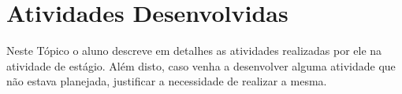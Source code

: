 
\section{Atividades Desenvolvidas}
    \label{sec:atividades-desenvolvidas}
    
    Neste Tópico o aluno descreve em detalhes as atividades realizadas por ele na atividade de estágio. Além disto, caso venha a desenvolver alguma atividade que não estava planejada, justificar a necessidade de realizar a mesma.
